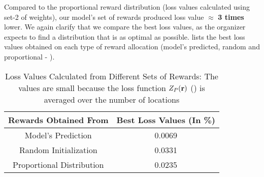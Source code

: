 Compared to the proportional reward distribution (loss values calculated using set-2 of weights), our model's set of rewards produced loss value $\approx$ \textbf{3 times} lower. We again clarify that we compare the best loss values, as the organizer expects to find a distribution that is as optimal as possible.   lists the best loss values obtained on each type of reward allocation (model's predicted, random and proportional - ).
\begin{table}[!htbp]
    \centering
    \caption[Loss Values Calculated from Different Sets of Rewards]{Loss Values Calculated from Different Sets of Rewards: The values are small because the loss function $Z_P(\mathbf{r})$ () is averaged over the number of locations}
    \label{tab:Loss Values Calculated from Different Sets of Rewards}
    \begin{tabular}{|c|c|}
        \hline
        \textbf{Rewards Obtained From} & \textbf{Best Loss Values (In \%)}\\
        \hline
        Model's Prediction & 0.0069\\
        Random Initialization & 0.0331\\
        Proportional Distribution & 0.0235\\
        \hline
    \end{tabular}
\end{table}

